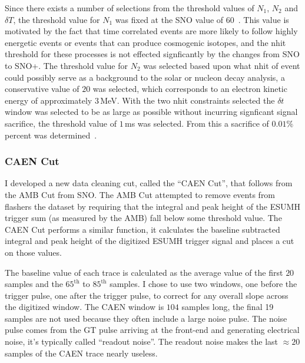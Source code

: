 Since there exists a number of selections from the threshold values of $N_{1}$,
$N_{2}$ and $\delta T$, the threshold value for $N_{1}$ was fixed at the SNO value
of $60$~\citep{neil_thesis}.
This value is motivated by the fact that time correlated events are more
likely to follow highly energetic events or events that can produce cosmogenic
isotopes, and the nhit threshold for these processes is not effected signficantly
by the changes from SNO to SNO+.
The threshold value for $N_{2}$ was selected based upon what nhit of event
could possibly serve as a background to the solar or nucleon decay analysis,
a conservative value of $20$ was selected, which corresponds to an electron kinetic energy
of approximately $3$\,MeV.
With the two nhit constraints selected the $\delta t$ window was selected to
be as large as possible without incurring signficant signal sacrifice,
the threshold value of $1$\,ms was selected.
From this a sacrifice of $0.01\%$ percent was determined~\citep{dc_document}.

\subsubsection{CAEN Cut}
I developed a new data cleaning cut, called the ``CAEN Cut'', that follows from
the AMB Cut from SNO\@.
The AMB Cut attempted to remove events from flashers the dataset by requiring
that the integral and peak height of the ESUMH trigger sum (as measured by the
AMB) fall below some threshold value.
The CAEN Cut performs a similar function, it calculates the baseline subtracted
integral and peak height of the digitized ESUMH trigger signal and places a cut on those values.

The baseline value of each trace is calculated as the average value of the first
$20$ samples and the $65^{\text{th}}$ to $85^{\text{th}}$ samples.
I chose to use two windows, one before the trigger pulse, one after the trigger pulse, to
correct for any overall slope across the digitized window.
The CAEN window is $104$ samples long, the final 19 samples are not used because they often
include a large noise pulse.
The noise pulse comes from the GT pulse arriving at the front-end and generating electrical noise,
it's typically called ``readout noise''.
The readout noise makes the last $\approx20$ samples of the CAEN trace nearly
useless.

